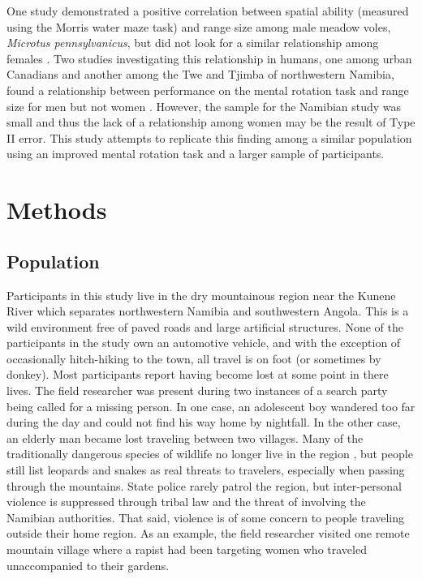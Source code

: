 One study demonstrated a positive correlation between spatial ability (measured using the Morris water maze task) and range size among male meadow voles, \emph{Microtus pennsylvanicus}, but did not look for a similar relationship among females \citep{spritzer2005influence}.  Two studies investigating this relationship in humans, one among urban Canadians and another among the Twe and Tjimba of northwestern Namibia, found a relationship between performance on the mental rotation task and range size for men but not women \citep{vashro2014spatial}.  However, the sample for the Namibian study was small and thus the lack of a relationship among women may be the result of Type II error.  This study attempts to replicate this finding among a similar population using an improved mental rotation task and a larger sample of participants. 

\section{Methods}
\label{sec:2}
	\subsection{Population}
Participants in this study live in the dry mountainous region near the Kunene River which separates northwestern Namibia and southwestern Angola.  This is a wild environment free of paved roads and large artificial structures.  None of the participants in the study own an automotive vehicle, and with the exception of occasionally hitch-hiking to the town, all travel is on foot (or sometimes by donkey).  Most participants report having become lost at some point in there lives.  The field researcher was present during two instances of a search party being called for a missing person.  In one case, an adolescent boy wandered too far during the day and could not find his way home by nightfall.  In the other case, an elderly man became lost traveling between two villages.  Many of the traditionally dangerous species of wildlife no longer live in the region \citep{viljoen1982distribution}, but people still list leopards and snakes as real threats to travelers, especially when passing through the mountains.  State police rarely patrol the region, but inter-personal violence is suppressed through tribal law and the threat of involving the Namibian authorities.  That said, violence is of some concern to people traveling outside their home region.  As an example, the field researcher visited one remote mountain village where a rapist had been targeting women who traveled unaccompanied to their gardens.

